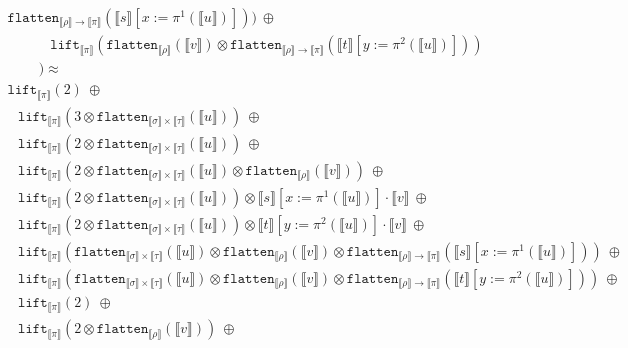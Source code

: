 \documentclass[a4paper,UKenglish,cleveref,autoref,numberwithinsect]{lipics-v2019}
\theoremstyle{definition}
\newcommand{\arrtype}{\rightarrow}
\newcommand{\flatten}{\mathtt{flatten}}
\newcommand{\lift}{\mathtt{lift}}
\newcommand{\typeinterpret}[1]{\llbracket #1 \rrbracket}
\newcommand{\interpret}[1]{\llbracket #1 \rrbracket}
\begin{document}
\begin{itemize}
\[\begin{array}{l}
    \flatten_{\typeinterpret{\rho} \arrtype \typeinterpret{\pi}}(
    \interpret{s}[x:=\pi^1(\interpret{u})]))\ \oplus \\
  \phantom{ABCD}
  \lift_{\typeinterpret{\pi}}(
    \flatten_{\typeinterpret{\rho}}(\interpret{v}) \otimes
    \flatten_{\typeinterpret{\rho} \arrtype
    \typeinterpret{\pi}}(\interpret{t}[y:=\pi^2(\interpret{u})])) \\
  \phantom{ABC}) \approx \\
  \lift_{\typeinterpret{\pi}}(2)\ \oplus \\
  \phantom{A}
  \lift_{\typeinterpret{\pi}}(3 \otimes \flatten_{\typeinterpret{\sigma}
    \times \typeinterpret{\tau}}(\interpret{u}))\ \oplus \\
  \phantom{A}\lift_{\typeinterpret{\pi}}(2 \otimes
    \flatten_{\typeinterpret{\sigma} \times
    \typeinterpret{\tau}}(\interpret{u}))\ \oplus \\
  \phantom{A}
  \lift_{\typeinterpret{\pi}}(2 \otimes
    \flatten_{\typeinterpret{\sigma} \times
    \typeinterpret{\tau}}(\interpret{u}) \otimes
    \flatten_{\typeinterpret{\rho}}(\interpret{v}))\ \oplus \\
  \phantom{A}
  \lift_{\typeinterpret{\pi}}(2 \otimes
    \flatten_{\typeinterpret{\sigma} \times
    \typeinterpret{\tau}}(\interpret{u})) \otimes
    \interpret{s}[x:=\pi^1(\interpret{u})] \cdot \interpret{v}\ \oplus\\
  \phantom{A}
  \lift_{\typeinterpret{\pi}}(2 \otimes
    \flatten_{\typeinterpret{\sigma} \times
    \typeinterpret{\tau}}(\interpret{u})) \otimes
    \interpret{t}[y:=\pi^2(\interpret{u})] \cdot \interpret{v}\ \oplus \\
  \phantom{A}
  \lift_{\typeinterpret{\pi}}(\flatten_{\typeinterpret{\sigma} \times
    \typeinterpret{\tau}}(\interpret{u}) \otimes
    \flatten_{\typeinterpret{\rho}}(\interpret{v}) \otimes
    \flatten_{\typeinterpret{\rho} \arrtype \typeinterpret{\pi}}(
    \interpret{s}[x:=\pi^1(\interpret{u})]))\ \oplus \\
  \phantom{A}
  \lift_{\typeinterpret{\pi}}(\flatten_{\typeinterpret{\sigma} \times
    \typeinterpret{\tau}}(\interpret{u}) \otimes
    \flatten_{\typeinterpret{\rho}}(\interpret{v}) \otimes
    \flatten_{\typeinterpret{\rho} \arrtype \typeinterpret{\pi}}(
    \interpret{t}[y:=\pi^2(\interpret{u})]))\ \oplus \\
  \phantom{A}
  \lift_{\typeinterpret{\pi}}(2)\ \oplus \\
  \phantom{A}
  \lift_{\typeinterpret{\pi}}(2 \otimes \flatten_{
    \typeinterpret{\rho}}(\interpret{v}))\ \oplus \\

\end{array}\]
\end{itemize}
\end{document}
